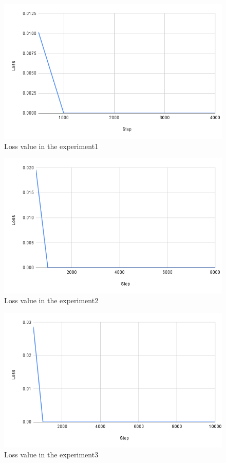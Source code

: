 \newpage
\begin{figure}[h]
  \centering
  \includegraphics[keepaspectratio, scale=0.31]{images/exp1.1_4000.png}
  \caption{Loss value in the experiment1}
  \label{Fig:exp1.1_4000}
  \end{figure}

\begin{figure}[h]
  \centering
  \includegraphics[keepaspectratio, scale=0.31]{images/exp1.1_8000.png}
  \caption{Loss value in the experiment2}
  \label{Fig:exp1.1_8000}
  \end{figure}

\begin{figure}[h]
  \centering
  \includegraphics[keepaspectratio, scale=0.31]{images/exp1.1_10000.png}
  \caption{Loss value in the experiment3}
  \label{Fig:exp1.1_10000}
  \end{figure}

